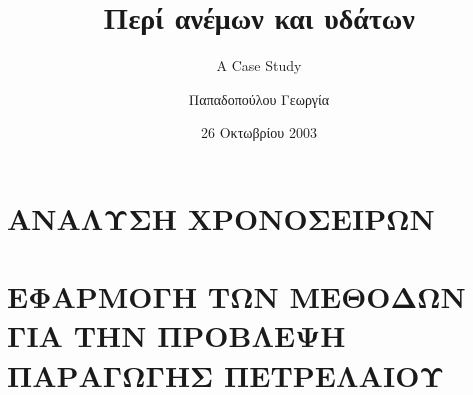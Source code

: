 \documentclass[twoside,a4paper]{book}
\author{Παπαδοπούλου Γεωργία}
\title{Περί ανέμων και υδάτων}
\subtitle{A Case Study}
\date{26 Οκτωβρίου 2003}
\begin{document}



\tableofcontents



\cleardoublepage


\part{ΑΝΑΛΥΣΗ ΧΡΟΝΟΣΕΙΡΩΝ}





\part{ΕΦΑΡΜΟΓΗ ΤΩΝ ΜΕΘΟΔΩΝ ΓΙΑ ΤΗΝ ΠΡΟΒΛΕΨΗ ΠΑΡΑΓΩΓΗΣ ΠΕΤΡΕΛΑΙΟΥ}





\appendix




\backmatter

\printindex

\clearpage


\end{document}
